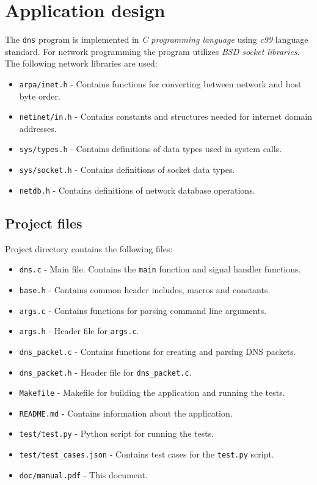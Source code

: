 \documentclass[a4paper, 11pt]{article}
\begin{document}
\section{Application design}

    The \texttt{dns} program is implemented in \emph{C programming language} using \emph{c99} language standard.
    For network programming the program utilizes \emph{BSD socket libraries}.
    The following network libraries are used:
    \begin{itemize}
        \item \texttt{arpa/inet.h} - Contains functions for converting between network and host byte order.
        \item \texttt{netinet/in.h} - Contains constants and structures needed for internet domain addresses.
        \item \texttt{sys/types.h} - Contains definitions of data types used in system calls.
        \item \texttt{sys/socket.h} - Contains definitions of socket data types.
        \item \texttt{netdb.h} - Contains definitions of network database operations.
    \end{itemize}

    \subsection{Project files}
        Project directory contains the following files:
        \begin{itemize}
            \item \texttt{dns.c} - Main file. Contains the \texttt{main} function and signal handler functions.
            \item \texttt{base.h} - Contains common header includes, macros and constants.
            \item \texttt{args.c} - Contains functions for parsing command line arguments.
            \item \texttt{args.h} - Header file for \texttt{args.c}.
            \item \texttt{dns\_packet.c} - Contains functions for creating and parsing DNS packets.
            \item \texttt{dns\_packet.h} - Header file for \texttt{dns\_packet.c}.
            \item \texttt{Makefile} - Makefile for building the application and running the tests.
            \item \texttt{README.md} - Contains information about the application.
            \item \texttt{test/test.py} - Python script for running the tests.
            \item \texttt{test/test\_cases.json} - Contains test cases for the \texttt{test.py} script.
            \item \texttt{doc/manual.pdf} - This document.
        \end{itemize}
\end{document}
